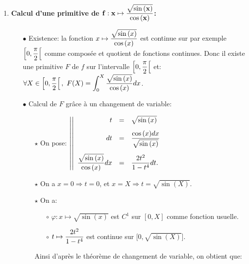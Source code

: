 \documentclass[a4paper, 11pt,reqno]{article}
\begin{document}
\begin{correction}
\begin{enumerate}
		\item \textbf{Calcul d'une primitive de $\mathbf{f: x\mapsto \displaystyle\frac{\sqrt{\sin{(x)}}}{\cos{(x)}} }$:}
		      \begin{itemize}
			      \item[$\bullet$] Existence: la fonction $x\mapsto  \displaystyle\frac{\sqrt{\sin{(x)}}}{\cos{(x)}}$ est continue sur par exemple
			            $\left\lbrack 0,\displaystyle\frac{\pi}{2}\right\lbrack$ comme compos\'ee et quotient de fonctions continues. Donc il existe une primitive $F$ de $f$ sur l'intervalle $\left\lbrack 0,\displaystyle\frac{\pi}{2}\right\lbrack$ et: $\forall X\in\left\lbrack 0,\displaystyle\frac{\pi}{2}\right\lbrack,\  \displaystyle F(X)=\int_0^X \frac{\sqrt{\sin{(x)}}}{\cos{(x)}} dx$.
			      \item[$\bullet$] Calcul de $F$ gr\^{a}ce \`{a} un changement de variable:
			            \begin{itemize}
				            \item[$\star$] On pose: $\left| \left|\begin{array}{rll}
						                  t                                          & = & \sqrt{\sin{(x)}}\vsec                          \\
						                  dt                                         & = & \ddp\frac{\cos{(x)}dx}{\sqrt{\sin{(x)}}} \vsec \\
						                  \ddp\frac{\sqrt{\sin{(x)}}}{\cos{(x)}}  dx & = & \ddp\frac{2t^2}{1-t^4}dt.
					                  \end{array}\right.\right.$
				            \item[$\star$] On a $x=0 \Rightarrow t=0$, et $x=X \Rightarrow t= \sqrt{\sin(X)}$.
				            \item[$\star$] On a:
				                  \begin{itemize}
					                  \item[$\circ$] $\varphi: x\mapsto \sqrt{\sin{(x)}}$ est $C^1$ sur $\left\lbrack 0,X \right\rbrack$ comme fonction usuelle.
					                  \item[$\circ$] $t\mapsto  \displaystyle\frac{2t^2}{1-t^4} $ est continue sur $\lbrack 0,\sqrt{\sin{(X)}}\rbrack$.
				                  \end{itemize}
				                  Ainsi d'apr\`{e}s le th\'eor\`{e}me de changement de variable, on obtient que:

\end{itemize}
\end{itemize}
\end{enumerate}
\end{correction}
\end{document}

